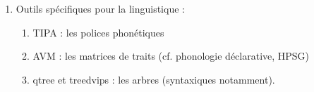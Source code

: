 \begin{enumerate}
  \item Outils spécifiques pour la linguistique :
    
    \begin{enumerate}
    \item TIPA : les polices phonétiques 
    \item AVM : les matrices de traits (cf.  phonologie déclarative, HPSG) 
    \item qtree et treedvips : les arbres (syntaxiques notamment).
    \end{enumerate}
  
\end{enumerate}




